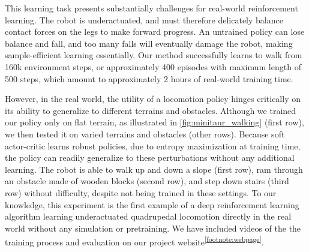 %
%
%
%
%
%

This learning task presents substantially challenges for real-world reinforcement learning. The robot is underactuated, and must therefore delicately balance contact forces on the legs to make forward progress. An untrained policy can lose balance and fall, and too many falls will eventually damage the robot, making sample-efficient learning essentially. Our method successfully learns to walk from 160k environment steps, or approximately 400 episodes with maximum length of 500 steps, which amount to approximately 2 hours of real-world training time.

However, in the real world, the utility of a locomotion policy hinges critically on its ability to generalize to different terrains and obstacles. Although we trained our policy only on flat terrain, as illustrated in \autoref{fig:minitaur_walking} (first row), we then tested it on varied terrains and obstacles (other rows). Because soft actor-critic learns robust policies, due to entropy maximization at training time, the policy can readily generalize to these perturbations without any additional learning. The robot is able to walk up and down a slope (first row), ram through an obstacle made of wooden blocks (second row), and step down stairs (third row) without difficulty, despite not being trained in these settings. To our knowledge, this experiment is the first example of a deep reinforcement learning algorithm learning underactuated quadrupedal locomotion directly in the real world without any simulation or pretraining. We have included videos of the the training process and evaluation on our project website\textsuperscript{\ref{footnote:webpage}}\!\!.





